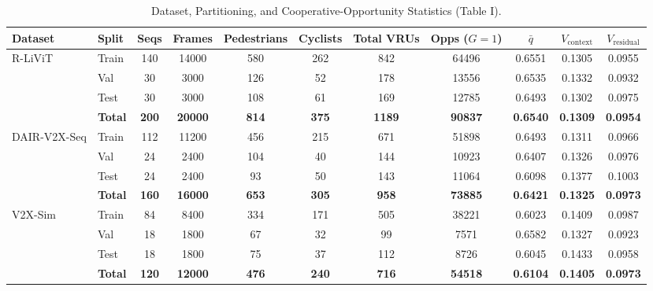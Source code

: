 \begin{table}[!t]
\caption{Dataset, Partitioning, and Cooperative-Opportunity Statistics (Table I).}
\label{tab:dataset_stats}
\centering
\small
\begin{tabular}{llccccccccc}
\toprule
Dataset & Split & Seqs & Frames & Pedestrians & Cyclists & Total VRUs & Opps ($G=1$) & $\bar{q}$ & $V_{\text{context}}$ & $V_{\text{residual}}$ \\
\midrule
R-LiViT & Train & 140 & 14000 & 580 & 262 & 842 & 64496 & 0.6551 & 0.1305 & 0.0955 \\
 & Val & 30 & 3000 & 126 & 52 & 178 & 13556 & 0.6535 & 0.1332 & 0.0932 \\
 & Test & 30 & 3000 & 108 & 61 & 169 & 12785 & 0.6493 & 0.1302 & 0.0975 \\
 & \textbf{Total} & \textbf{200} & \textbf{20000} & \textbf{814} & \textbf{375} & \textbf{1189} & \textbf{90837} & \textbf{0.6540} & \textbf{0.1309} & \textbf{0.0954} \\
\midrule
DAIR-V2X-Seq & Train & 112 & 11200 & 456 & 215 & 671 & 51898 & 0.6493 & 0.1311 & 0.0966 \\
 & Val & 24 & 2400 & 104 & 40 & 144 & 10923 & 0.6407 & 0.1326 & 0.0976 \\
 & Test & 24 & 2400 & 93 & 50 & 143 & 11064 & 0.6098 & 0.1377 & 0.1003 \\
 & \textbf{Total} & \textbf{160} & \textbf{16000} & \textbf{653} & \textbf{305} & \textbf{958} & \textbf{73885} & \textbf{0.6421} & \textbf{0.1325} & \textbf{0.0973} \\
\midrule
V2X-Sim & Train & 84 & 8400 & 334 & 171 & 505 & 38221 & 0.6023 & 0.1409 & 0.0987 \\
 & Val & 18 & 1800 & 67 & 32 & 99 & 7571 & 0.6582 & 0.1327 & 0.0923 \\
 & Test & 18 & 1800 & 75 & 37 & 112 & 8726 & 0.6045 & 0.1433 & 0.0958 \\
 & \textbf{Total} & \textbf{120} & \textbf{12000} & \textbf{476} & \textbf{240} & \textbf{716} & \textbf{54518} & \textbf{0.6104} & \textbf{0.1405} & \textbf{0.0973} \\
\bottomrule
\end{tabular}
\end{table}